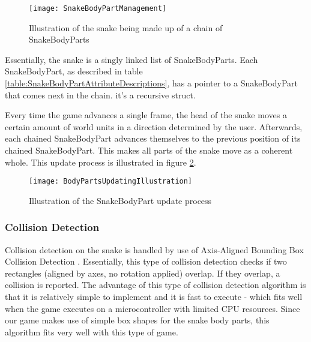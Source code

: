 \begin{figure}[H]
	\texttt{[image: SnakeBodyPartManagement]}
	\centering
	\caption{Illustration of the snake being made up of a chain of SnakeBodyParts}
	\label{SnakeBodyPartManagement}
\end{figure} 

Essentially, the snake is a singly linked list \cite{LinkedLists} of SnakeBodyParts. Each SnakeBodyPart, as described in table \ref{table:SnakeBodyPartAttributeDescriptions}, has a pointer to a SnakeBodyPart that comes next in the chain. it's a recursive struct.

Every time the game advances a single frame, the head of the snake moves a certain amount of world units in a direction determined by the user. Afterwards, each chained SnakeBodyPart advances themselves to the previous position of its chained SnakeBodyPart. This makes all parts of the snake move as a coherent whole. This update process is illustrated in figure \ref{SnakeBodyPartUpdateProcess}.

\begin{figure}[H]
	\texttt{[image: BodyPartsUpdatingIllustration]}
	\centering
	\caption{Illustration of the SnakeBodyPart update process}
	\label{SnakeBodyPartUpdateProcess}
\end{figure} 

\subsubsection{Collision Detection}
\label{section:CollisionDetection}

Collision detection on the snake is handled by use of Axis-Aligned Bounding Box Collision Detection \cite{CollisionDetection}. Essentially, this type of collision detection checks if two rectangles (aligned by axes, no rotation applied) overlap. If they overlap, a collision is reported. The advantage of this type of collision detection algorithm is that it is relatively simple to implement and it is fast to execute - which fits well when the game executes on a microcontroller with limited CPU resources. Since our game makes use of simple box shapes for the snake body parts, this algorithm fits very well with this type of game.







